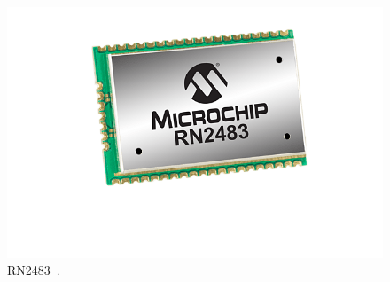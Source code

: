     \begin{figure}[H]%
        \centering
        \includegraphics[scale=0.3]{res/rn2483.png}
        \caption{RN2483~\cite{rn2483:shop}.}
        \label{fig:state-rn2483}
    \end{figure}


